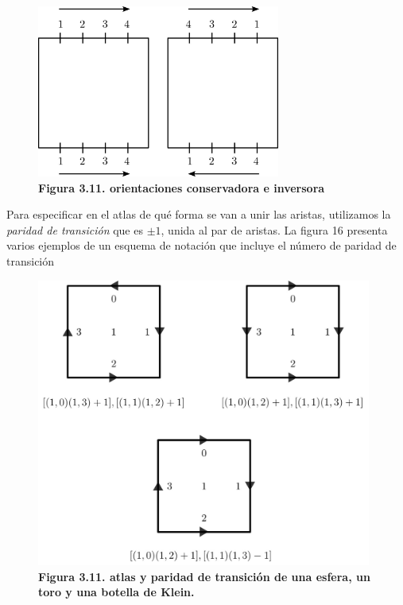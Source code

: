 \begin{figure}[h]
\includegraphics[width=8cm]{Img/GEO/geo-atlas1.jpg}
\centering
\caption{\textbf{Figura 3.11. \footnotesize{orientaciones conservadora e inversora}}}
\end{figure}

Para especificar en el atlas de qué forma se van a unir las aristas, utilizamos la \textit{paridad de transición} que es $\pm 1$, unida al par de aristas. La figura 16 presenta varios ejemplos de un esquema de notación que incluye el número de paridad de transición

\begin{figure}[h]
\includegraphics[width=11cm]{Img/GEO/geo-atlas2.jpg}
\centering
\caption{\textbf{Figura 3.11. \footnotesize{atlas y paridad de transición de una esfera, un toro y una botella de Klein.}}}
\end{figure}


